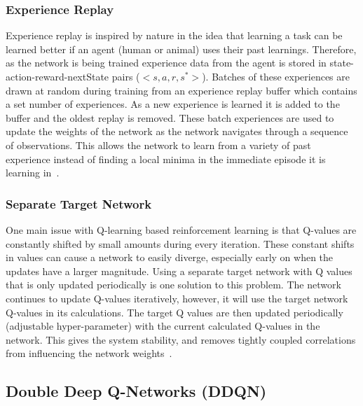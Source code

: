 \documentclass[12pt,american]{report}
\begin{document}
\subsubsection{Experience Replay}

Experience replay is inspired by nature in the idea that learning a task can be learned better if an agent (human or animal) uses their past learnings.  Therefore, as the network is being trained experience data from the agent is stored in state-action-reward-nextState pairs ($<s,a,r,s^{*}>$). Batches of these experiences are drawn at random during training from an experience replay buffer which contains a set number of experiences.  As a new experience is learned it is added to the buffer and the oldest replay is removed. These batch experiences are used to update the weights of the network as the network navigates through a sequence of observations.  This allows the network to learn from a variety of past experience instead of finding a local minima in the immediate episode it is learning in~\cite{atari}.

\subsubsection{Separate Target Network}

One main issue with Q-learning based reinforcement learning is that Q-values are constantly shifted by small amounts during every iteration.  These constant shifts in values can cause a network to easily diverge, especially early on when the updates have a larger magnitude.  Using a separate target network with Q values that is only updated periodically is one solution to this problem.  The network continues to update Q-values iteratively, however, it will use the target network Q-values in its calculations.  The target Q values are then updated periodically (adjustable hyper-parameter) with the current calculated Q-values in the network.  This gives the system stability, and removes tightly coupled correlations from influencing the network weights~\cite{atari}.


\subsection{Double Deep Q-Networks (DDQN)}
\end{document}
